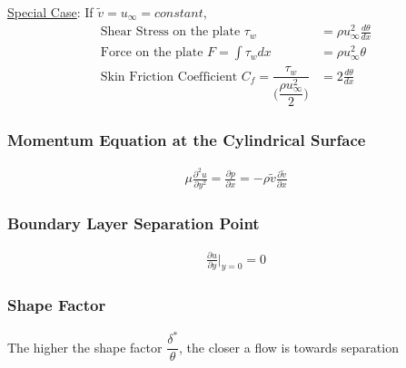 \documentclass[11pt, letterpaper, notitlepage]{article}
\begin{document}
\underline{Special Case}: If $\tilde{v} = u_{\infty} = constant$,
\begin{align*}
\text{Shear Stress on the plate } \tau_w &= \rho u_{\infty}^2 \frac{d \theta}{d x} \\
\text{Force on the plate } F = \int \tau_w dx &= \rho u_{\infty}^2 \theta \\
\text{Skin Friction Coefficient } C_f = \dfrac{\tau_w}{\biggl(\dfrac{\rho u_{\infty}^2}{2}\biggr)} &= 2 \frac{d \theta}{d x}
\end{align*}

\subsubsection{Momentum Equation at the Cylindrical Surface}
\begin{align*}
\mu \frac{\partial^2 u}{\partial y^2} = \frac{\partial p}{\partial x} = - \rho \tilde{v} \frac{\partial \tilde{v}}{\partial x}
\end{align*}

\subsubsection{Boundary Layer Separation Point}
\begin{align*}
\frac{\partial u}{\partial y} \biggr\rvert_{y=0} = 0
\end{align*}

\subsubsection{Shape Factor}
The higher the shape factor $\dfrac{\delta^*}{\theta}$, the closer a flow is towards separation
\end{document}
